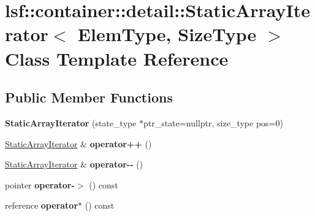 \hypertarget{classlsf_1_1container_1_1detail_1_1StaticArrayIterator}{
\section{lsf::container::detail::StaticArrayIterator$<$ ElemType, SizeType $>$ Class Template Reference}
\label{classlsf_1_1container_1_1detail_1_1StaticArrayIterator}
}
\subsection*{Public Member Functions}
\begin{DoxyCompactItemize}
\item 
\hypertarget{classlsf_1_1container_1_1detail_1_1StaticArrayIterator_a8f53d59be8217d88c90fd9145e9d91de}{
{\bfseries StaticArrayIterator} (state\_\-type $\ast$ptr\_\-state=nullptr, size\_\-type pos=0)}
\label{classlsf_1_1container_1_1detail_1_1StaticArrayIterator_a8f53d59be8217d88c90fd9145e9d91de}

\item 
\hypertarget{classlsf_1_1container_1_1detail_1_1StaticArrayIterator_aa318149dac97e1c0e41a4d8c54f815df}{
\hyperlink{classlsf_1_1container_1_1detail_1_1StaticArrayIterator}{StaticArrayIterator} \& {\bfseries operator++} ()}
\label{classlsf_1_1container_1_1detail_1_1StaticArrayIterator_aa318149dac97e1c0e41a4d8c54f815df}

\item 
\hypertarget{classlsf_1_1container_1_1detail_1_1StaticArrayIterator_ae15f3519f8029152063b583db7512bf0}{
\hyperlink{classlsf_1_1container_1_1detail_1_1StaticArrayIterator}{StaticArrayIterator} \& {\bfseries operator-\/-\/} ()}
\label{classlsf_1_1container_1_1detail_1_1StaticArrayIterator_ae15f3519f8029152063b583db7512bf0}

\item 
\hypertarget{classlsf_1_1container_1_1detail_1_1StaticArrayIterator_abd7a9d000ac6105ed337bf00024695c7}{
pointer {\bfseries operator-\/$>$} () const }
\label{classlsf_1_1container_1_1detail_1_1StaticArrayIterator_abd7a9d000ac6105ed337bf00024695c7}

\item 
\hypertarget{classlsf_1_1container_1_1detail_1_1StaticArrayIterator_a27df28a0acc8c6b23282e3802313d40a}{
reference {\bfseries operator$\ast$} () const }
\label{classlsf_1_1container_1_1detail_1_1StaticArrayIterator_a27df28a0acc8c6b23282e3802313d40a}


\end{DoxyCompactItemize}
